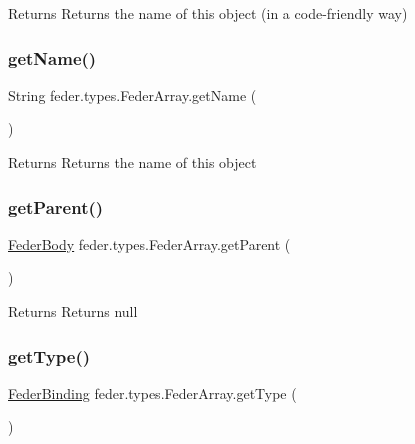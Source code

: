 \begin{DoxyReturn}{Returns}
Returns the name of this object (in a code-\/friendly way) 
\end{DoxyReturn}
\mbox{\label{classfeder_1_1types_1_1FederArray_a3a03529799560dd4453a2c7091ea6337}} 
\subsubsection{\texorpdfstring{get\+Name()}{getName()}}
{\footnotesize\ttfamily String feder.\+types.\+Feder\+Array.\+get\+Name (\begin{DoxyParamCaption}{ }\end{DoxyParamCaption})}

\begin{DoxyReturn}{Returns}
Returns the name of this object 
\end{DoxyReturn}
\mbox{\label{classfeder_1_1types_1_1FederArray_a1b547ac37dd2072afb7bd7360342f1f1}} 
\subsubsection{\texorpdfstring{get\+Parent()}{getParent()}}
{\footnotesize\ttfamily \hyperlink{classfeder_1_1types_1_1FederBody}{Feder\+Body} feder.\+types.\+Feder\+Array.\+get\+Parent (\begin{DoxyParamCaption}{ }\end{DoxyParamCaption})}

\begin{DoxyReturn}{Returns}
Returns null 
\end{DoxyReturn}
\mbox{\label{classfeder_1_1types_1_1FederArray_ae4d5fffefb7cf173ed04a86b4a6c2de0}} 
\subsubsection{\texorpdfstring{get\+Type()}{getType()}}
{\footnotesize\ttfamily \hyperlink{classfeder_1_1types_1_1FederBinding}{Feder\+Binding} feder.\+types.\+Feder\+Array.\+get\+Type (\begin{DoxyParamCaption}{ }\end{DoxyParamCaption})}

